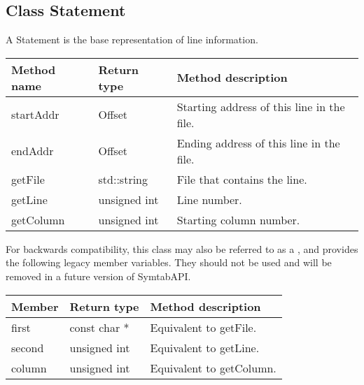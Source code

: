 \subsection{Class Statement}\label{Statement}

A Statement is the base representation of line information. 

\begin{tabular}{|l|l|l|}
	\hline
	Method name & Return type & Method description \\
	\hline
	startAddr & Offset & Starting address of this line in the file. \\
	endAddr & Offset & Ending address of this line in the file. \\
	getFile & std::string & File that contains the line.   \\
	getLine & unsigned int & Line number. \\
	getColumn & unsigned int & Starting column number. \\
	\hline
\end{tabular}

For backwards compatibility, this class may also be referred to as a , and provides the following legacy member variables. They should not be used and will be removed in a future version of SymtabAPI. 

\begin{tabular}{|l|l|l|}
	\hline
	Member & Return type & Method description \\
	\hline
	first & const char * & Equivalent to getFile. \\
	second & unsigned int & Equivalent to getLine. \\
	column & unsigned int & Equivalent to getColumn. \\ 
\hline
\end{tabular}
